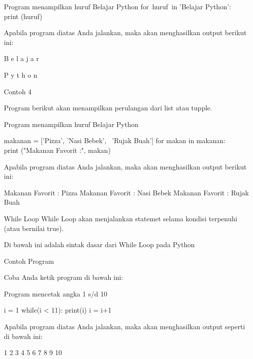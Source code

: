 
Program menampilkan huruf Belajar Python 
for~huruf~in 'Belajar Python':    
~~ print (huruf) 

Apabila program diatas Anda jalankan, maka akan menghasilkan output berikut ini:

 
B 
e 
l 
a 
j 
a 
r 
  
P 
y 
t 
h 
o 
n 

Contoh 4

Program berikut akan menampilkan perulangan dari list atau tupple.

 
Program menampilkan huruf Belajar Python 

makanan = ['Pizza', 'Nasi Bebek',~ 'Rujak Buah'] 
for makan in makanan: 
~~ print ("Makanan Favorit :", makan) 

Apabila program diatas Anda jalankan, maka akan menghasilkan output berikut ini:

 
Makanan Favorit : Pizza 
Makanan Favorit : Nasi Bebek 
Makanan Favorit : Rujak Buah 



While Loop 
While Loop akan menjalankan statemet selama kondisi terpenuhi (atau bernilai true).

Di bawah ini adalah sintak dasar dari While Loop pada Python

Contoh Program

Coba Anda ketik program di bawah ini:

 
Program mencetak angka 1 s/d 10 

i = 1 
while(i < 11): 
 print(i) 
 i = i+1 

Apabila program diatas Anda jalankan, maka akan menghasilkan output seperti di bawah ini:

 
1 
2 
3 
4 
5 
6 
7 
8 
9 
10 

